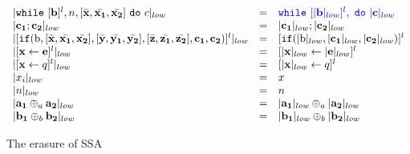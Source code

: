 \documentclass[a4paper,11pt]{article}
\begin{document}
%
\begin{figure}
   \[
 \begin{array}{lll}
    | 
    \ewhile ~ [ \ssa{\bexpr} ]^{l}, n, [\bar{\ssa{x}}, \bar{\ssa{x_1}}, \bar{\ssa{x_2}}] ~ \edo ~  c
    |_{low}  
    &=&  
    \jl{\ewhile ~ [|\ssa{\bexpr}|_{low}]^{l},  ~ \edo ~ |\ssa{c}|_{low} 
    }\\
      |\ssa{c_1 ; c_2}|_{low}  &=& |\ssa{c_1}|_{low} ; |\ssa{c_2}|_{low} \\
       |[\eif(\sbexpr,[ \bar{\ssa{x}}, \bar{\ssa{x_1}}, \bar{\ssa{x_2}}] ,[ \bar{\ssa{y}}, \bar{\ssa{y_1}}, \bar{\ssa{y_2}}] , [ \bar{\ssa{z}}, \bar{\ssa{z_1}}, \bar{\ssa{z_2}}] , \ssa{ c_1, c_2)}]^{l}|_{low}  &=&
       [\eif(|\sbexpr|_{low}, |\ssa{ c_1}|_{low}, |\ssa{c_2}|_{low})]^{l}\\
       | [\assign {\ssa{x}}{\ssa{\expr}}]^{l}|_{low} & = & [\assign {|\ssa{x}|_{low}}{|\ssa{\expr}|_{low}} ]^{l}  \\
       | [\assign {\ssa{x}}{q} ]^{l} |_{low} & = & [\assign {|\ssa{x}|_{low}}{q}]^{l} \\
       |x_i|_{low} & = & x \\
       |n |_{low} & = & n \\
      | \ssa{\aexpr_1} \oplus_{a} \ssa{\aexpr_2} |_{low} & = &  |\ssa{\aexpr_1}|_{low} \oplus_a |\ssa{\aexpr_2}|_{low} \\
      | \ssa{\bexpr_1} \oplus_{b} \ssa{\bexpr_2} |_{low} & = &  |\ssa{\bexpr_1}|_{low} \oplus_b |\ssa{\bexpr_2}|_{low}
 \end{array}
\]
    \caption{The erasure of SSA}
    \label{fig:ssa_erasure-while}
\end{figure}
\end{document}
